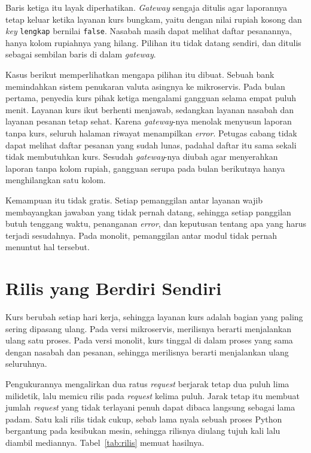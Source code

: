 Baris ketiga itu layak diperhatikan. \textit{Gateway} sengaja ditulis agar laporannya
tetap keluar ketika layanan kurs bungkam, yaitu dengan nilai rupiah kosong dan
\textit{key} \texttt{lengkap} bernilai \texttt{false}. Nasabah masih dapat melihat
daftar pesanannya, hanya kolom rupiahnya yang hilang. Pilihan itu tidak datang
sendiri, dan ditulis sebagai sembilan baris di dalam \textit{gateway}.

Kasus berikut memperlihatkan mengapa pilihan itu dibuat. Sebuah bank memindahkan
sistem penukaran valuta asingnya ke mikroservis. Pada bulan pertama, penyedia
kurs pihak ketiga mengalami gangguan selama empat puluh menit. Layanan kurs ikut
berhenti menjawab, sedangkan layanan nasabah dan layanan pesanan tetap sehat.
Karena \textit{gateway}-nya menolak menyusun laporan tanpa kurs, seluruh halaman riwayat
menampilkan \textit{error}. Petugas cabang tidak dapat melihat daftar pesanan yang sudah
lunas, padahal daftar itu sama sekali tidak membutuhkan kurs. Sesudah \textit{gateway}-nya
diubah agar menyerahkan laporan tanpa kolom rupiah, gangguan serupa pada bulan
berikutnya hanya menghilangkan satu kolom.

Kemampuan itu tidak gratis. Setiap pemanggilan antar layanan wajib membayangkan
jawaban yang tidak pernah datang, sehingga setiap panggilan butuh tenggang
waktu, penanganan \textit{error}, dan keputusan tentang apa yang harus terjadi
sesudahnya. Pada monolit, pemanggilan antar modul tidak pernah menuntut hal
tersebut.

\section{Rilis yang Berdiri Sendiri}

Kurs berubah setiap hari kerja, sehingga layanan kurs adalah bagian yang paling
sering dipasang ulang. Pada versi mikroservis, merilisnya berarti menjalankan
ulang satu proses. Pada versi monolit, kurs tinggal di dalam proses yang sama
dengan nasabah dan pesanan, sehingga merilisnya berarti menjalankan ulang
seluruhnya.

Pengukurannya mengalirkan dua ratus \textit{request} berjarak tetap dua puluh lima
milidetik, lalu memicu rilis pada \textit{request} kelima puluh. Jarak tetap itu
membuat jumlah \textit{request} yang tidak terlayani penuh dapat dibaca langsung
sebagai lama padam. Satu kali rilis tidak cukup, sebab lama nyala sebuah proses
Python bergantung pada kesibukan mesin, sehingga rilisnya diulang tujuh kali
lalu diambil mediannya. Tabel~\ref{tab:rilis} memuat hasilnya.

